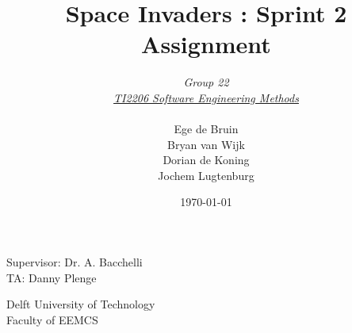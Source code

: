 \documentclass[10pt]{article}
\begin{document}
\title{Space Invaders : Sprint 2 Assignment}
\date{\today}
\author{\textit{Group 22}\\ \textit{\underline{TI2206 Software Engineering Methods}} \\
 \\Ege de Bruin \\ Bryan van Wijk \\ Dorian de Koning \\ Jochem Lugtenburg }
 \maketitle  
 \begin{center}
Supervisor: Dr. A. Bacchelli\\
TA: Danny Plenge\\
 \end{center}     
 \begin{center}
 Delft University of Technology\\
 Faculty of EEMCS\\
 \end{center}
 \thispagestyle{empty}
 \pagebreak
 

\end{document}
